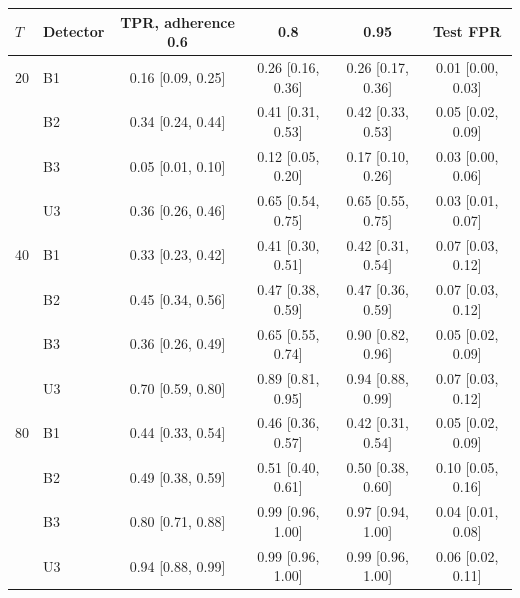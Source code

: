 \begin{tabular}{llcccc}
\toprule
$T$ & Detector & TPR, adherence 0.6 & 0.8 & 0.95 & Test FPR \\
\midrule
20 & B1 & 0.16 [0.09, 0.25] & 0.26 [0.16, 0.36] & 0.26 [0.17, 0.36] & 0.01 [0.00, 0.03] \\
 & B2 & 0.34 [0.24, 0.44] & 0.41 [0.31, 0.53] & 0.42 [0.33, 0.53] & 0.05 [0.02, 0.09] \\
 & B3 & 0.05 [0.01, 0.10] & 0.12 [0.05, 0.20] & 0.17 [0.10, 0.26] & 0.03 [0.00, 0.06] \\
 & U3 & 0.36 [0.26, 0.46] & 0.65 [0.54, 0.75] & 0.65 [0.55, 0.75] & 0.03 [0.01, 0.07] \\
\midrule
40 & B1 & 0.33 [0.23, 0.42] & 0.41 [0.30, 0.51] & 0.42 [0.31, 0.54] & 0.07 [0.03, 0.12] \\
 & B2 & 0.45 [0.34, 0.56] & 0.47 [0.38, 0.59] & 0.47 [0.36, 0.59] & 0.07 [0.03, 0.12] \\
 & B3 & 0.36 [0.26, 0.49] & 0.65 [0.55, 0.74] & 0.90 [0.82, 0.96] & 0.05 [0.02, 0.09] \\
 & U3 & 0.70 [0.59, 0.80] & 0.89 [0.81, 0.95] & 0.94 [0.88, 0.99] & 0.07 [0.03, 0.12] \\
\midrule
80 & B1 & 0.44 [0.33, 0.54] & 0.46 [0.36, 0.57] & 0.42 [0.31, 0.54] & 0.05 [0.02, 0.09] \\
 & B2 & 0.49 [0.38, 0.59] & 0.51 [0.40, 0.61] & 0.50 [0.38, 0.60] & 0.10 [0.05, 0.16] \\
 & B3 & 0.80 [0.71, 0.88] & 0.99 [0.96, 1.00] & 0.97 [0.94, 1.00] & 0.04 [0.01, 0.08] \\
 & U3 & 0.94 [0.88, 0.99] & 0.99 [0.96, 1.00] & 0.99 [0.96, 1.00] & 0.06 [0.02, 0.11] \\
\bottomrule
\end{tabular}
